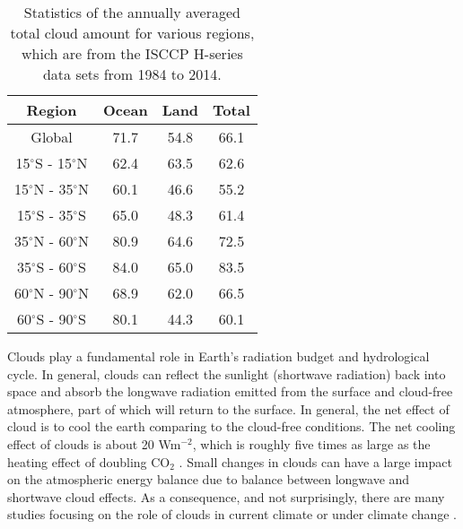 \begin{table}[htp]
\centering
\caption{Statistics of the annually averaged total cloud amount for various regions, which are from the ISCCP H-series data sets \citep{Young2018} from 1984 to 2014.}
\vspace{0.5em}
\begin{tabular}{cccc}
	\toprule
	Region & Ocean & Land &  Total\\
	\midrule
	Global & 71.7 & 54.8 & 66.1 \\
	15$^\circ$S - 15$^\circ$N &  62.4&  63.5& 62.6 \\
	15$^\circ$N - 35$^\circ$N &  60.1&  46.6& 55.2\\
	15$^\circ$S - 35$^\circ$S &  65.0&  48.3& 61.4\\
	35$^\circ$N - 60$^\circ$N &  80.9&  64.6& 72.5 \\
	35$^\circ$S - 60$^\circ$S &  84.0&  65.0& 83.5 \\
	60$^\circ$N - 90$^\circ$N &  68.9&  62.0& 66.5\\
	60$^\circ$S - 90$^\circ$S &  80.1&  44.3& 60.1 \\
	\bottomrule
\end{tabular}
\label{tab:statistics_cld_amt}
\end{table}

Clouds play a fundamental role in Earth's radiation budget and hydrological cycle. In general, clouds can reflect the sunlight (shortwave radiation) back into space and absorb the longwave radiation emitted from the surface and cloud-free atmosphere, part of which will return to the surface. In general, the net effect of cloud is to cool the earth comparing to the cloud-free conditions. The net cooling effect of clouds is about 20 Wm$^{-2}$, which is roughly five times as large as the heating effect of doubling CO$_2$ \citep{Zelinka2017,Wild2019}. Small changes in clouds can have a large impact on the atmospheric energy balance due to balance between longwave and shortwave cloud effects. As a consequence, and not surprisingly, there are many studies focusing on the role of clouds in current climate or under climate change \citep[e.g.,][]{Cess1990intercomparison,Zelinka2017}.


